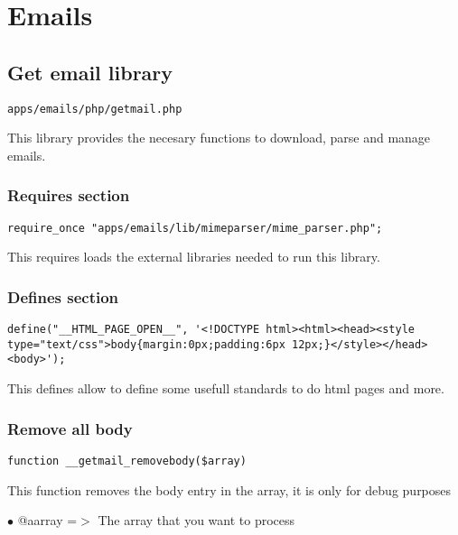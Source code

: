 \documentclass[a4paper]{book}
\begin{document}
\chapter{Emails}

\hypertarget{toc29}{}
\section{Get email library}

\begin{lstlisting}
apps/emails/php/getmail.php
\end{lstlisting}

This library provides the necesary functions to download, parse and manage emails.

\hypertarget{toc30}{}
\subsection{Requires section}

\begin{lstlisting}
require_once "apps/emails/lib/mimeparser/mime_parser.php";
\end{lstlisting}

This requires loads the external libraries needed to run this library.

\hypertarget{toc31}{}
\subsection{Defines section}

\begin{lstlisting}
define("__HTML_PAGE_OPEN__", '<!DOCTYPE html><html><head><style type="text/css">body{margin:0px;padding:6px 12px;}</style></head><body>');
\end{lstlisting}

This defines allow to define some usefull standards to do html pages and more.

\hypertarget{toc32}{}
\subsection{Remove all body}

\begin{lstlisting}
function __getmail_removebody($array)
\end{lstlisting}

This function removes the body entry in the array, it is only for debug purposes

\begin{compactitem}
\item[\color{myblue}$\bullet$] @aarray =$>$ The array that you want to process
\end{compactitem}
\end{document}
